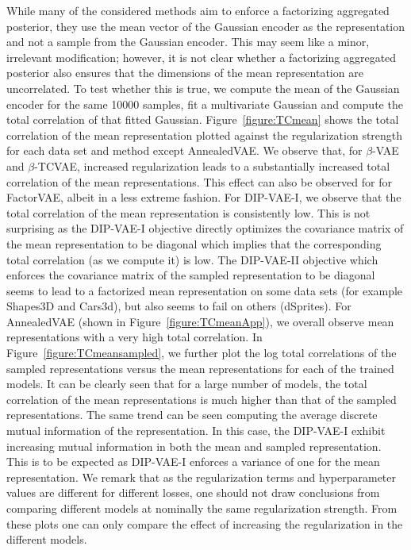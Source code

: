 While many of the considered methods aim to enforce a factorizing aggregated posterior, they use the mean vector of the Gaussian encoder as the representation and not a sample from the Gaussian encoder.
This may seem like a minor, irrelevant modification; however, it is not clear whether a factorizing aggregated posterior also ensures that the dimensions of the mean representation are uncorrelated.
To test whether this is true, we compute the mean of the Gaussian encoder for the same \num{10000} samples, fit a multivariate Gaussian and compute the total correlation of that fitted Gaussian.
Figure~\ref{figure:TCmean} shows the total correlation of the mean representation plotted against the regularization strength for each data set and method except AnnealedVAE.
We observe that, for $\beta$-VAE and $\beta$-TCVAE, increased regularization leads to a substantially increased total correlation of the mean representations.
This effect can also be observed for for FactorVAE, albeit in a less extreme fashion.
For DIP-VAE-I, we observe that the total correlation of the mean representation is consistently low.
This is not surprising as the DIP-VAE-I objective directly optimizes the covariance matrix of the mean representation to be diagonal which implies that the corresponding total correlation (as we compute it) is low.
The DIP-VAE-II objective which enforces the covariance matrix of the sampled representation to be diagonal seems to lead to a factorized mean representation on some data sets (for example Shapes3D and Cars3d), but also seems to fail on others (dSprites).
For AnnealedVAE (shown in Figure~\ref{figure:TCmeanApp}), we overall observe mean representations with a very high total correlation.
In Figure~\ref{figure:TCmeansampled}, we further plot the log total correlations of the sampled representations versus the mean representations for each of the trained models.
It can be clearly seen that for a large number of models, the total correlation of the mean representations is much higher than that of the sampled representations. The same trend can be seen computing the average discrete mutual information of the representation. In this case, the DIP-VAE-I exhibit increasing mutual information in both the mean and sampled representation. This is to be expected as DIP-VAE-I enforces a variance of one for the mean representation. We remark that as the regularization terms and hyperparameter values are different for different losses, one should not draw conclusions from comparing different models at nominally the same regularization strength. From these plots one can only compare the effect of increasing the regularization in the different models.

